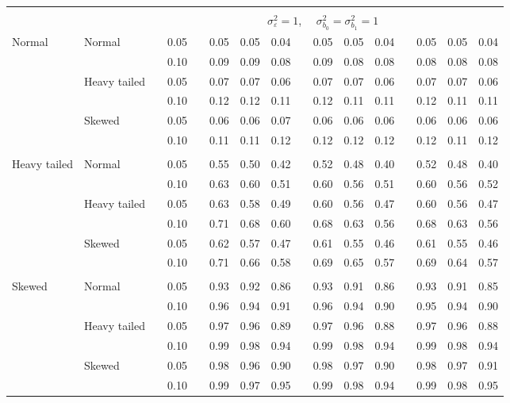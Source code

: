 \begin{table}[ht]
\begin{scriptsize}
\begin{center}
\begin{tabular}{ll p{.1cm} c p{.1cm} rrr p{.1cm} rrr p{.1cm} rrr}
&&&&&&&&&&&&&&&\\
& && && \multicolumn{9}{c}{$\sigma_{\varepsilon}^2 = 1$, \ \ $\sigma_{b_0}^2 = \sigma_{b_1}^2 = 1$} \\ \cline{6-16}
\rowcolor{gray!20} Normal       & Normal       && 0.05 &&   0.05 & 0.05 & 0.04 && 0.05 & 0.05 & 0.04 && 0.05 & 0.05 & 0.04 \\ 
\rowcolor{gray!20}             &              && 0.10 &&   0.09 & 0.09 & 0.08 && 0.09 & 0.08 & 0.08 && 0.08 & 0.08 & 0.08 \\ 
\rowcolor{gray!20}             & Heavy tailed && 0.05 &&   0.07 & 0.07 & 0.06 && 0.07 & 0.07 & 0.06 && 0.07 & 0.07 & 0.06 \\ 
\rowcolor{gray!20}             &              && 0.10 &&   0.12 & 0.12 & 0.11 && 0.12 & 0.11 & 0.11 && 0.12 & 0.11 & 0.11 \\ 
\rowcolor{gray!20}             & Skewed       && 0.05 &&   0.06 & 0.06 & 0.07 && 0.06 & 0.06 & 0.06 && 0.06 & 0.06 & 0.06 \\ 
\rowcolor{gray!20}             &              && 0.10 &&   0.11 & 0.11 & 0.12 && 0.12 & 0.12 & 0.12 && 0.12 & 0.11 & 0.12 \\
             &&&&&&&&&&&&&&&\\  
Heavy tailed & Normal       && 0.05 &&   0.55 & 0.50 & 0.42 && 0.52 & 0.48 & 0.40 && 0.52 & 0.48 & 0.40 \\ 
             &              && 0.10 &&   0.63 & 0.60 & 0.51 && 0.60 & 0.56 & 0.51 && 0.60 & 0.56 & 0.52 \\ 
             & Heavy tailed && 0.05 &&   0.63 & 0.58 & 0.49 && 0.60 & 0.56 & 0.47 && 0.60 & 0.56 & 0.47 \\ 
             &              && 0.10 &&   0.71 & 0.68 & 0.60 && 0.68 & 0.63 & 0.56 && 0.68 & 0.63 & 0.56 \\ 
             & Skewed       && 0.05 &&   0.62 & 0.57 & 0.47 && 0.61 & 0.55 & 0.46 && 0.61 & 0.55 & 0.46 \\ 
             &              && 0.10 &&   0.71 & 0.66 & 0.58 && 0.69 & 0.65 & 0.57 && 0.69 & 0.64 & 0.57 \\ 
             &&&&&&&&&&&&&&&\\ 
Skewed       & Normal       && 0.05 &&   0.93 & 0.92 & 0.86 && 0.93 & 0.91 & 0.86 && 0.93 & 0.91 & 0.85 \\ 
             &              && 0.10 &&   0.96 & 0.94 & 0.91 && 0.96 & 0.94 & 0.90 && 0.95 & 0.94 & 0.90 \\ 
             & Heavy tailed && 0.05 &&   0.97 & 0.96 & 0.89 && 0.97 & 0.96 & 0.88 && 0.97 & 0.96 & 0.88 \\ 
             &              && 0.10 &&   0.99 & 0.98 & 0.94 && 0.99 & 0.98 & 0.94 && 0.99 & 0.98 & 0.94 \\ 
             & Skewed       && 0.05 &&   0.98 & 0.96 & 0.90 && 0.98 & 0.97 & 0.90 && 0.98 & 0.97 & 0.91 \\ 
             &              && 0.10 &&   0.99 & 0.97 & 0.95 && 0.99 & 0.98 & 0.94 && 0.99 & 0.98 & 0.95 \\ 



\end{tabular}
\end{center}
\end{scriptsize}
\end{table}
